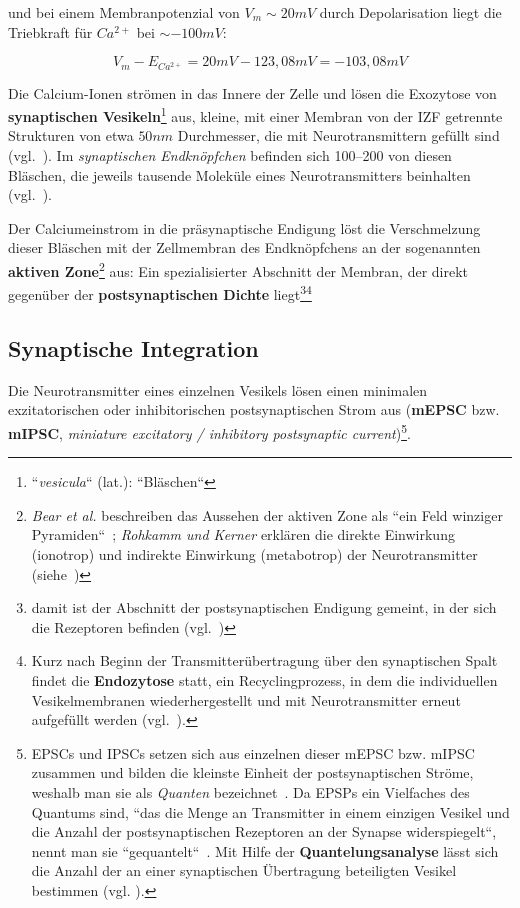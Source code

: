 {und bei einem Membranpotenzial von $V_m \sim 20 mV$ durch Depolarisation liegt die Triebkraft für $Ca^{2+}$ bei $\sim -100 mV$:

\begin{equation}
    V_m - E_{Ca^{2+}} = 20 mV - 123,08 mV = -103,08 mV
    \label{eq:gl-triebkraftca2}
\end{equation}


Die Calcium-Ionen strömen in das Innere der Zelle und lösen die Exozytose von \textbf{synaptischen Vesikeln}\footnote{
    ``\textit{vesicula}`` (lat.): ``Bläschen``
} aus, kleine, mit einer Membran von der IZF getrennte Strukturen von etwa $50 nm$ Durchmesser, die mit Neurotransmittern gefüllt sind (vgl.~\cite[1000]{BCP18}).
Im \textit{synaptischen Endknöpfchen} befinden sich 100--200 von diesen Bläschen, die jeweils tausende Moleküle eines Neurotransmitters beinhalten (vgl.~\cite[184]{KSJ+13}).

Der Calciumeinstrom in die präsynaptische Endigung löst die Verschmelzung dieser Bläschen mit der Zellmembran des Endknöpfchens an der sogenannten \textbf{aktiven Zone}\footnote{
    \textit{Bear et al.} beschreiben das Aussehen der aktiven Zone als ``ein Feld winziger Pyramiden``~\cite[123]{BCP18}; \textit{Rohkamm und Kerner} erklären die direkte Einwirkung (ionotrop) und indirekte Einwirkung (metabotrop) der Neurotransmitter (siehe~\cite[134]{RK18})
} aus: Ein spezialisierter Abschnitt der Membran, der direkt gegenüber der \textbf{postsynaptischen Dichte} liegt\footnote{
    damit ist der Abschnitt der postsynaptischen Endigung gemeint, in der sich die Rezeptoren befinden (vgl.~\cite[96]{HS19a})
}\footnote{
    Kurz nach Beginn der Transmitterübertragung über den synaptischen Spalt findet die \textbf{Endozytose} statt, ein Recyclingprozess, in dem die individuellen Vesikelmembranen wiederhergestellt und mit Neurotransmitter erneut aufgefüllt werden (vgl.~\cite[133]{BCP18}).
}


\subsection*{Synaptische Integration}

Die Neurotransmitter eines einzelnen Vesikels lösen einen minimalen exzitatorischen oder inhibitorischen postsynaptischen Strom aus (\textbf{mEPSC} bzw. \textbf{mIPSC}, \textit{miniature excitatory / inhibitory postsynaptic current})\footnote{
    EPSCs und IPSCs setzen sich aus einzelnen dieser mEPSC bzw. mIPSC zusammen und bilden die kleinste Einheit der postsynaptischen Ströme, weshalb man sie als \textit{Quanten} bezeichnet~\cite[98]{HS19a}.
    Da EPSPs ein Vielfaches des Quantums sind, ``das die Menge an Transmitter in einem einzigen Vesikel und die Anzahl der postsynaptischen Rezeptoren an der Synapse widerspiegelt``, nennt man sie ``gequantelt``~\cite[142]{BCP18}. Mit Hilfe der \textbf{Quantelungsanalyse} lässt sich die Anzahl der an einer synaptischen Übertragung beteiligten Vesikel bestimmen (vgl. \cite[142]{BCP18}).
}.

}
